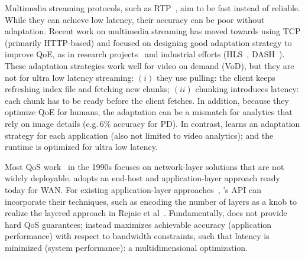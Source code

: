  Multimedia streaming protocols, such as
RTP~\cite{schulzrinne2006rtp}, aim to be fast instead of reliable. While they
can achieve low latency, their accuracy can be poor without adaptation.  Recent
work on multimedia streaming has moved towards using TCP (primarily HTTP-based)
and focused on designing good adaptation strategy to improve QoE, as in research
projects~\cite{mao2017neural, sun2016cs2p, yin2015control} and industrial
efforts (HLS~\cite{pantos2016http}, DASH~\cite{michalos2012dynamic,
  sodagar2011mpeg}). These adaptation strategies work well for video on demand
(VoD), but they are not for ultra low latency streaming: $(i)$ they use pulling:
the client keeps refreshing index file and fetching new chunks; $(ii)$ chunking
introduces latency: each chunk has to be ready before the client fetches.  In
addition, because they optimize QoE for humans, the adaptation can be a mismatch
for analytics that rely on image details (e.g.\,6\% accuracy for PD). In
contrast, \sysname{} learns an adaptation strategy for each application (also
not limited to video analytics); and the runtime is optimized for ultra low
latency.

 Most QoS work~\cite{ferrari1990scheme, shenker1994integrated,
  shenker1995fundamental} in the 1990s focuses on network-layer solutions that
are not widely deployable. \sysname{} adopts an end-host and application-layer
approach ready today for WAN. For existing application-layer
approaches~\cite{vandalore2001survey}, \sysname{}'s API can incorporate their
techniques, such as encoding the number of layers as a knob to realize the
layered approach in Rejaie et al~\cite{rejaie2000layered}. Fundamentally,
\sysname{} does not provide hard QoS guarantees; instead \sysname{} maximizes
achievable accuracy (application performance) with respect to bandwidth
constraints, such that latency is minimized (system performance): a
multidimensional optimization.



